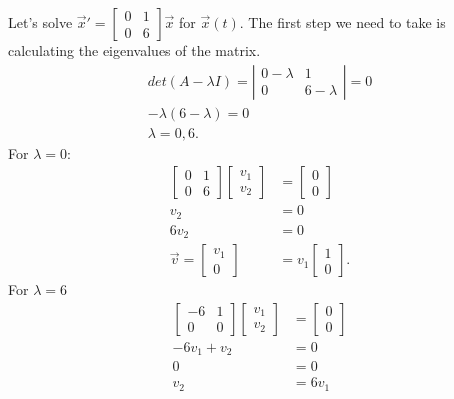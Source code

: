 \begin{eg}
  Let's solve $\vec{x}'=\begin{bmatrix} 0&1\\0&6 \end{bmatrix} \vec{x}$ for $\vec{x}(t)$. The first step we need to take is calculating the eigenvalues of the matrix.
  \begin{align*}
    det(A-\lambda I)=\left| \begin{matrix} 0-\lambda&1\\0&6-\lambda \end{matrix} \right| =0\\
    -\lambda(6-\lambda)=0\\
    \lambda=0,6
  .\end{align*}
  For $\lambda=0$:
  \begin{align*}
    \begin{bmatrix} 0&1\\0&6 \end{bmatrix} \begin{bmatrix} v_1\\v_2 \end{bmatrix} &=\begin{bmatrix} 0\\0 \end{bmatrix} \\
    v_2&=0\\
    6v_2&=0\\
    \vec{v}=\begin{bmatrix} v_1\\0 \end{bmatrix} &=v_1\begin{bmatrix} 1\\0 \end{bmatrix} 
  .\end{align*}
  For $\lambda=6$
  \begin{align*}
    \begin{bmatrix} -6&1\\0&0 \end{bmatrix} \begin{bmatrix} v_1\\v_2 \end{bmatrix} &=\begin{bmatrix} 0\\0 \end{bmatrix} \\
    -6v_1+v_2&=0\\
    0&=0\\
    v_2&=6v_1\\

\end{align*}
\end{eg}
